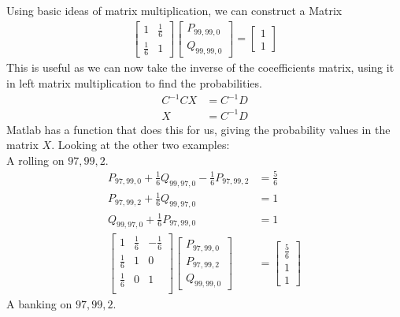 \documentclass[a4paper,titlepage]{article}
\begin{document}
Using basic ideas of matrix multiplication, we can construct a Matrix
\begin{align*}
	\begin{bmatrix}
	    1          & \frac{1}{6}\\
	    \frac{1}{6} & 1
	\end{bmatrix}
	\begin{bmatrix}
		P_{99,99,0}\\
		Q_{99,99,0}
	\end{bmatrix}
	=
	\begin{bmatrix}
		1\\
		1
	\end{bmatrix}
\end{align*}
This is useful as we can now take the inverse of the coeefficients matrix, using it in left matrix multiplication to find the probabilities.
\begin{align*}
	C^{-1}CX &= C^{-1}D\\
	X        &= C^{-1}D
\end{align*}
Matlab has a function that does this for us, giving the probability values in the matrix $X$.
Looking at the other two examples:\\
A rolling on $97,99,2$.
\begin{align*}
	P_{97,99,0} + \frac{1}{6}Q_{99,97,0} - \frac{1}{6}P_{97,99,2} &= \frac{5}{6}\\
	P_{97,99,2} + \frac{1}{6}Q_{99,97,0}                          &=  1\\
	Q_{99,97,0} + \frac{1}{6}P_{97,99,0}                          &= 1\\
	\begin{bmatrix}
		1           & \frac{1}{6} & -\frac{1}{6}\\
		\frac{1}{6} & 1           & 0\\
		\frac{1}{6} & 0           & 1\\
	\end{bmatrix}
	\begin{bmatrix}
		P_{97,99,0}\\
		P_{97,99,2}\\
		Q_{99,99,0}
	\end{bmatrix}
	& =
	\begin{bmatrix}
		\frac{5}{6}\\
		1\\
		1
	\end{bmatrix}
\end{align*}
A banking on $97,99,2$.
\end{document}
